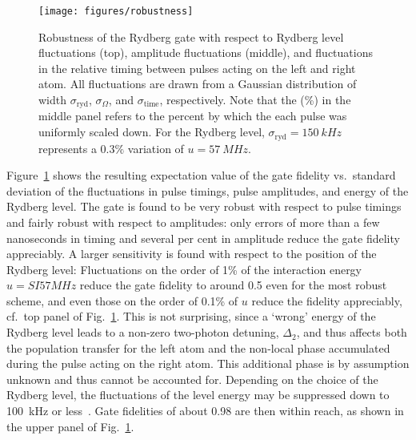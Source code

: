 \begin{figure}[tb]
  \centering
  \texttt{[image: figures/robustness]}
  \caption{%
    Robustness of the Rydberg gate with respect
    to Rydberg level fluctuations (top), amplitude fluctuations
    (middle), and fluctuations in the relative timing between
    pulses acting on the left and right atom. All fluctuations are
    drawn from a Gaussian distribution of width $\sigma_{\text{ryd}}$,
    $\sigma_{\Omega}$, and $\sigma_{\text{time}}$, respectively. Note
    that the (\%) in the middle panel refers to the percent by which the
    each pulse was uniformly scaled down. For the Rydberg level,
    $\sigma_{\text{ryd}} = \SI{150}{kHz}$ represents a $0.3\%$ variation of
    $u=\SI{57}{MHz}$.}
  \label{fig:pulserobust}
\end{figure}
Figure~\ref{fig:pulserobust} shows the resulting expectation value of the
gate fidelity vs.\ standard
deviation of the fluctuations in pulse timings, pulse amplitudes,
and energy of the Rydberg level.
The gate is found to be very robust with respect to pulse timings
and fairly robust with respect to amplitudes: only errors of more
than a few nanoseconds in timing and several per cent in amplitude
reduce the gate fidelity appreciably.
A larger sensitivity is found with respect to the position of the Rydberg level:
Fluctuations on the order of 1\% of the interaction energy $u=SI{57}{MHz}$ reduce
the gate fidelity to around 0.5 even for the most robust scheme, and even those
on the order of 0.1\% of $u$ reduce the fidelity appreciably, cf.\ top
panel of Fig.~\ref{fig:pulserobust}. This is not surprising, since a
`wrong' energy of the Rydberg level leads to a non-zero two-photon
detuning, $\Delta_2$, and thus affects both the population
transfer for the left atom and the non-local phase accumulated during
the pulse acting on the right atom. This additional phase is by assumption
unknown and thus cannot be accounted for. Depending on the choice of the
Rydberg level, the fluctuations of the level energy may be
suppressed down to \SI{100}{kHz} or less~\cite{Saffman_pc}.
Gate fidelities of about 0.98 are then
within reach, as shown in the upper panel of Fig.~\ref{fig:pulserobust}.

